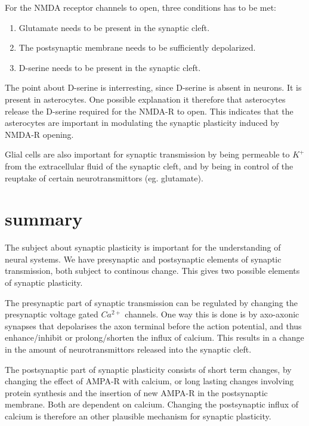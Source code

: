 For the NMDA receptor channels to open, three conditions has to be met:
\begin{enumerate}
	\item Glutamate needs to be present in the synaptic cleft.
	\item The postsynaptic membrane needs to be sufficiently depolarized.
	\item D-serine needs to be present in the synaptic cleft\cite{signallingBetweenGlialAndNeuronsInSynPlast}.
\end{enumerate}
The point about D-serine is interresting, since D-serine is absent in neurons. It is present in asterocytes.
One possible explanation it therefore that asterocytes release the D-serine required for the NMDA-R to open\cite{signallingBetweenGlialAndNeuronsInSynPlast}.  %
This indicates that the asterocytes are important in modulating the synaptic plasticity induced by NMDA-R opening.

Glial cells are also important for synaptic transmission by being permeable to $K^+$ from the extracellular fluid of the synaptic cleft\cite{PrinciplesOfNeuralScience4edKAP07}, 
and by being in control of the reuptake of certain neurotransmittors (eg. glutamate)\cite{PrinciplesOfNeuralScience4edKAP15}. %



\section{summary}
The subject about synaptic plasticity is important for the understanding of neural systems. 
We have presynaptic and postsynaptic elements of synaptic transmission, both subject to continous change. This gives two possible elements of synaptic plasticity. 

The presynaptic part of synaptic transmission can be regulated by changing the presynaptic voltage gated $Ca^{2+}$ channels. One way this is done is by axo-axonic synapses that depolarises the axon terminal before the action potential, and thus enhance/inhibit or prolong/shorten the influx of calcium. 
This results in a change in the amount of neurotransmittors released into the synaptic cleft.

The postsynaptic part of synaptic plasticity consists of short term changes, by changing the effect of AMPA-R with calcium, or long lasting changes involving protein synthesis and the insertion of new AMPA-R in the postsynaptic membrane. Both are dependent on calcium. Changing the postsynaptic influx of calcium is therefore an other plausible mechanism for synaptic plasticity.

